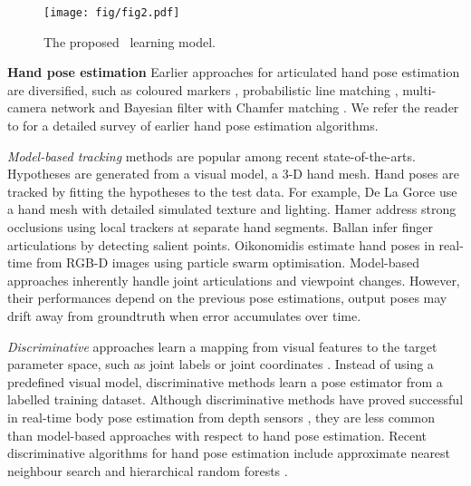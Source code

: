 \begin{figure*}[ht]
	\hspace{-4mm}
	\texttt{[image: fig/fig2.pdf]}
	\caption{The proposed \STR\ learning model.}
	\label{fig:concept}
\end{figure*}

\noindent\textbf{Hand pose estimation} Earlier approaches for articulated hand pose estimation are diversified, such as coloured markers \cite{Chua_IVC_02}, probabilistic line matching \cite{Athitsos_CVPR_03}, multi-camera network \cite{Guan_CVPRW_06} and Bayesian filter with Chamfer matching \cite{Stenger_PAMI_06}. 
We refer the reader to \cite{Erol_CVIU_07} for a detailed survey of earlier hand pose estimation algorithms. 

\emph{Model-based tracking} methods are popular among recent state-of-the-arts. Hypotheses are generated from a visual model, \eg a 3-D hand mesh. Hand poses are tracked by fitting the hypotheses to the test data. For example, De La Gorce \etal \cite{Gorce_PAMI_11} use a hand mesh with detailed simulated texture and lighting. Hamer \etal \cite{Hamer_ICCV_09} address strong occlusions using local trackers at separate hand segments. Ballan \etal \cite{Ballan_ECCV_12} infer finger articulations by detecting salient points.  
Oikonomidis \etal \cite{Oikonomidis_ICCV_11} estimate hand poses in real-time from RGB-D images using particle swarm optimisation. Model-based approaches inherently handle joint articulations and viewpoint changes. 
However, their performances depend on the previous pose estimations, output poses may drift away from groundtruth when error accumulates over time. 

\emph{Discriminative} approaches learn a mapping from visual features to the target parameter space, such as joint labels \cite{Shotton_CVPR_11} or joint coordinates \cite{Girshick_ICCV_11}.  
Instead of using a predefined visual model, discriminative methods learn a pose estimator from a labelled training dataset. 
Although discriminative methods have proved successful in real-time body pose estimation from depth sensors \cite{Shotton_CVPR_11, Girshick_ICCV_11, Baak_ICCV_11, Sun_CVPR_12}, they are less common than model-based approaches with respect to hand pose estimation. 
Recent discriminative algorithms for hand pose estimation include approximate nearest neighbour search \cite{Romero_Humanoids_09, Wang_TOG_09} and hierarchical random forests \cite{Keskin_ECCV_12}. 

